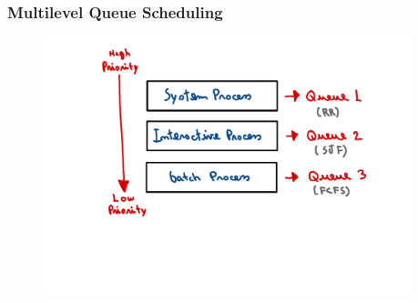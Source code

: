 \begin{frame}
    \frametitle{Multilevel Queue Scheduling}
    \begin{figure}
        \centering
        \includegraphics[width=0.95\textwidth]{slides/figures/mqs_example.pdf}
    \end{figure}
\end{frame}